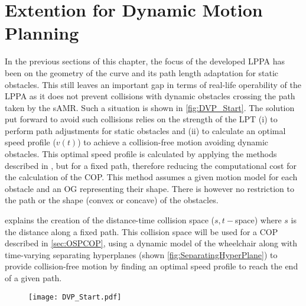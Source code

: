 \newpage

\section{Extention for Dynamic Motion Planning} \label{sec:DynPlan}
In the previous sections of this chapter, the focus of the developed LPPA has been on the geometry of the curve and its path length adaptation for static obstacles. This still leaves an important gap in terms of real-life operability of the LPPA as it does not prevent collisions with dynamic obstacles crossing the path taken by the sAMR. Such a situation is shown in \cref{fig:DVP_Start}. The solution put forward to avoid such collisions relies on the strength of the LPT (i) to perform path adjustments for static obstacles and (ii) to calculate an optimal speed profile ($v(t)$) to achieve a collision-free motion avoiding dynamic obstacles. This optimal speed profile is calculated by applying the methods described in , but for a fixed path, therefore reducing the computational cost for the calculation of the COP. This method assumes a given motion model for each obstacle and an OG representing their shape. There is however no restriction to the path or the shape (convex or concave) of the obstacles.

 explains the creation of the distance-time collision space ($s,t-$space) where $s$ is the distance along a fixed path. This collision space will be used for a COP described in \cref{sec:OSPCOP}, using a dynamic model of the wheelchair along with time-varying separating hyperplanes (shown \cref{fig:SeparatingHyperPlane}) to provide collision-free motion by finding an optimal speed profile to reach the end of a given path.

\begin{figure}[!htbp]
\centering
\texttt{[image: DVP\_Start.pdf]}
\end{figure}

\newpage

